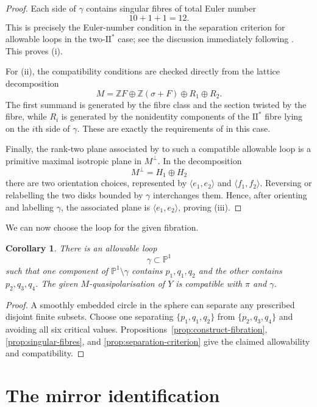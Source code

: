 \documentclass[11pt]{amsart}
\newtheorem{corollary}[theorem]{Corollary}
\theoremstyle{definition}
\newcommand{\PP}{\mathbb P}
\newcommand{\ZZ}{\mathbb Z}
\begin{document}
\begin{proof}
Each side of $\gamma$ contains singular fibres of total Euler number
\[
10+1+1=12.
\]
This is precisely the Euler-number condition in the separation criterion for
allowable loops in the two-$\mathrm{II}^*$ case; see the discussion
immediately following \cite[Definition~4.11]{GT24}.  This proves (i).

For (ii), the compatibility conditions are checked directly from the lattice
decomposition
\[
M
 =
\ZZ F\oplus\ZZ(\sigma+F)\oplus R_1\oplus R_2.
\]
The first summand is generated by the fibre class and the section twisted by
the fibre, while $R_i$ is generated by the nonidentity components of the
$\mathrm{II}^*$ fibre lying on the $i$th side of $\gamma$.  These are exactly
the requirements of \cite[Definition~4.21]{GT24} in this case.

Finally, the rank-two plane associated by \cite[Section~4]{GT24} to such a
compatible allowable loop is a primitive maximal isotropic plane in
$M^\perp$.  In the decomposition
\[
M^\perp=H_1\oplus H_2
\]
there are two orientation choices, represented by
$\langle e_1,e_2\rangle$ and $\langle f_1,f_2\rangle$.  Reversing or
relabelling the two disks bounded by $\gamma$ interchanges them.  Hence, after
orienting and labelling $\gamma$, the associated plane is
$\langle e_1,e_2\rangle$, proving (iii).
\end{proof}

We can now choose the loop for the given fibration.

\begin{corollary}\label{cor:loop-on-Y}
There is an allowable loop
\[
\gamma\subset\PP^1
\]
such that one component of $\PP^1\setminus\gamma$ contains
$p_1,q_1,q_2$ and the other contains $p_2,q_3,q_4$.  The given
$M$-quasipolarisation of $Y$ is compatible with $\pi$ and $\gamma$.
\end{corollary}

\begin{proof}
A smoothly embedded circle in the sphere can separate any prescribed disjoint
finite subsets.  Choose one separating
$\{p_1,q_1,q_2\}$ from $\{p_2,q_3,q_4\}$ and avoiding all six critical
values.  Propositions~\ref{prop:construct-fibration},
\ref{prop:singular-fibres}, and \ref{prop:separation-criterion} give the
claimed allowability and compatibility.
\end{proof}

\section{The mirror identification}
\end{document}
